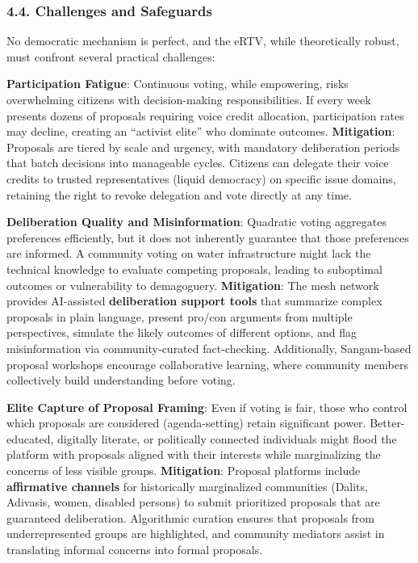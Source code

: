 \subsubsection{4.4. Challenges and
Safeguards}\label{challenges-and-safeguards}

No democratic mechanism is perfect, and the eRTV, while theoretically
robust, must confront several practical challenges:

\textbf{Participation Fatigue}: Continuous voting, while empowering,
risks overwhelming citizens with decision-making responsibilities. If
every week presents dozens of proposals requiring voice credit
allocation, participation rates may decline, creating an ``activist
elite'' who dominate outcomes. \textbf{Mitigation}: Proposals are tiered
by scale and urgency, with mandatory deliberation periods that batch
decisions into manageable cycles. Citizens can delegate their voice
credits to trusted representatives (liquid democracy) on specific issue
domains, retaining the right to revoke delegation and vote directly at
any time.

\textbf{Deliberation Quality and Misinformation}: Quadratic voting
aggregates preferences efficiently, but it does not inherently guarantee
that those preferences are informed. A community voting on water
infrastructure might lack the technical knowledge to evaluate competing
proposals, leading to suboptimal outcomes or vulnerability to
demagoguery. \textbf{Mitigation}: The mesh network provides AI-assisted
\textbf{deliberation support tools} that summarize complex proposals in
plain language, present pro/con arguments from multiple perspectives,
simulate the likely outcomes of different options, and flag
misinformation via community-curated fact-checking. Additionally,
Sangam-based proposal workshops encourage collaborative learning, where
community members collectively build understanding before voting.

\textbf{Elite Capture of Proposal Framing}: Even if voting is fair,
those who control which proposals are considered (agenda-setting) retain
significant power. Better-educated, digitally literate, or politically
connected individuals might flood the platform with proposals aligned
with their interests while marginalizing the concerns of less visible
groups. \textbf{Mitigation}: Proposal platforms include
\textbf{affirmative channels} for historically marginalized communities
(Dalits, Adivasis, women, disabled persons) to submit prioritized
proposals that are guaranteed deliberation. Algorithmic curation ensures
that proposals from underrepresented groups are highlighted, and
community mediators assist in translating informal concerns into formal
proposals.

